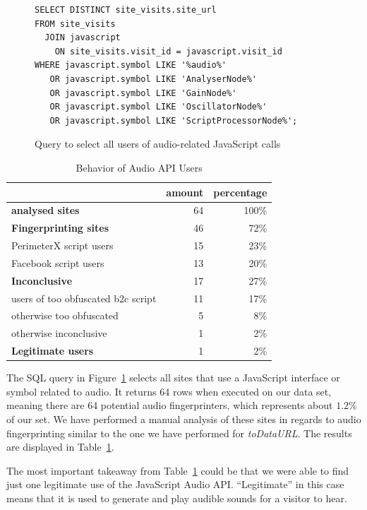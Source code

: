 \documentclass[
    fontsize=12pt,
    headings=small,
    parskip=half,
    bibliography=totoc,
    numbers=noenddot,
    open=any
    ]{scrreprt}
\begin{document}
\begin{figure}
\begin{verbatim}
SELECT DISTINCT site_visits.site_url
FROM site_visits
  JOIN javascript
    ON site_visits.visit_id = javascript.visit_id
WHERE javascript.symbol LIKE '%audio%'
   OR javascript.symbol LIKE 'AnalyserNode%'
   OR javascript.symbol LIKE 'GainNode%'
   OR javascript.symbol LIKE 'OscillatorNode%'
   OR javascript.symbol LIKE 'ScriptProcessorNode%';
\end{verbatim}
\caption{Query to select all users of audio-related JavaScript calls}
\label{code:audio_query}
\end{figure}

\begin{table}
\centering
\caption{Behavior of Audio API Users}
\begin{tabular}{l r r}
    \toprule
    & amount & percentage \\
    \midrule
    \textbf{analysed sites} & 64 & 100\% \\
    \midrule
    \textbf{Fingerprinting sites} & 46 & 72\% \\
    PerimeterX script users & 15 & 23\% \\
    Facebook script users & 13 & 20\% \\
    \midrule
    \textbf{Inconclusive} & 17 & 27\% \\
    users of too obfuscated b2c script & 11 & 17\% \\
    otherwise too obfuscated & 5 & 8\% \\
    otherwise inconclusive & 1 & 2\% \\
    \midrule
    \textbf{Legitimate users} & 1 & 2\% \\
    \bottomrule
\end{tabular}
\label{table:audio_users}
\end{table}

The SQL query in Figure~\ref{code:audio_query} selects all sites that
use a JavaScript interface or symbol related to audio.
It returns 64 rows when executed on our data set, meaning there are 64 potential audio
fingerprinters, which represents about $1.2\%$ of our set.
We have performed a manual analysis of these sites in regards to audio
fingerprinting similar to the one we have performed for \textit{toDataURL}.
The results are displayed in Table~\ref{table:audio_users}.

The most important takeaway from Table~\ref{table:audio_users} could be that we were
able to find just one legitimate use of the JavaScript Audio API.
``Legitimate'' in this case means that it is used to generate and play audible sounds
for a visitor to hear.
\end{document}
